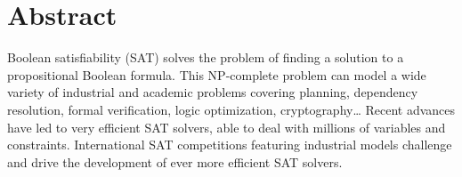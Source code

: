 %
%
%

\chapter*{Abstract}
%

Boolean satisfiability (SAT) solves the problem of finding a solution to a propositional Boolean formula.
This NP-complete problem can model a wide variety of industrial and academic problems
covering planning, dependency resolution, formal verification, logic optimization, cryptography\ldots
Recent advances have led to very efficient SAT solvers, able to deal with millions of variables and 
constraints. International SAT competitions featuring industrial models challenge and drive the
 development of ever more efficient SAT solvers.
 
